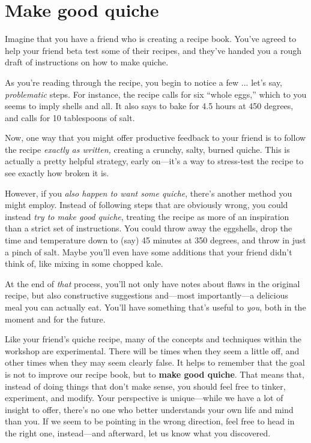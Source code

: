 \section*{Make good quiche}

Imagine that you have a friend who is creating a recipe book.  You've agreed to help your friend beta test some of their recipes, and they've handed you a rough draft of instructions on how to make quiche.

As you're reading through the recipe, you begin to notice a few ... let's say, \emph{problematic} steps.  For instance, the recipe calls for six ``whole eggs,'' which to you seems to imply shells and all.  It also says to bake for 4.5 hours at 450 degrees, and calls for 10 tablespoons of salt.

Now, one way that you might offer productive feedback to your friend is to follow the recipe \emph{exactly as written,} creating a crunchy, salty, burned quiche.  This is actually a pretty helpful strategy, early on---it's a way to stress-test the recipe to see exactly how broken it is.

However, if you \emph{also happen to want some quiche}, there's another method you might employ.  Instead of following steps that are obviously wrong, you could instead \emph{try to make good quiche}, treating the recipe as more of an inspiration than a strict set of instructions.  You could throw away the eggshells, drop the time and temperature down to (say) 45 minutes at 350 degrees, and throw in just a pinch of salt.  Maybe you'll even have some additions that your friend didn't think of, like mixing in some chopped kale.

At the end of \emph{that} process, you'll not only have notes about flaws in the original recipe, but also constructive suggestions and---most importantly---a delicious meal you can actually eat.  You'll have something that's useful to \emph{you}, both in the moment and for the future.

Like your friend's quiche recipe, many of the concepts and techniques within the workshop are experimental.  There will be times when they seem a little off, and other times when they may seem clearly false.  It helps to remember that the goal is not to improve our recipe book, but to \textbf{make good quiche}.  That means that, instead of doing things that don't make sense, you should feel free to tinker, experiment, and modify.  Your perspective is unique---while we have a lot of insight to offer, there's no one who better understands your own life and mind than you.  If we seem to be pointing in the wrong direction, feel free to head in the right one, instead---and afterward, let us know what you discovered.